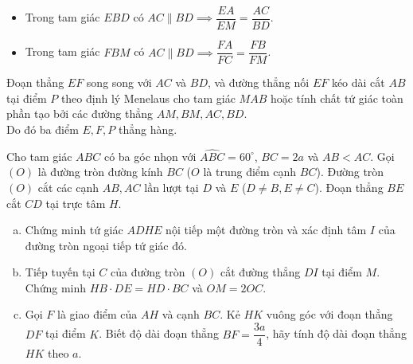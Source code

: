 \begin{bt}
{\begin{enumerate}[a)]
	\begin{itemize}
		\item Trong tam giác $EBD$ có $AC \parallel BD \implies \dfrac{EA}{EM} = \dfrac{AC}{BD}$.
		\item Trong tam giác $FBM$ có $AC \parallel BD \implies \dfrac{FA}{FC} = \dfrac{FB}{FM}$.
	\end{itemize}
	Đoạn thẳng $EF$ song song với $AC$ và $BD$, và đường thẳng nối $EF$ kéo dài cắt $AB$ tại điểm $P$ theo định lý Menelaus cho tam giác $MAB$ hoặc tính chất tứ giác toàn phần tạo bởi các đường thẳng $AM, BM, AC, BD$.\\
	Do đó ba điểm $E, F, P$ thẳng hàng.
\end{enumerate}
}
\end{bt}

\begin{bt}%
Cho tam giác $ABC$ có ba góc nhọn với $\widehat{ABC} = 60^\circ$, $BC = 2a$ và $AB < AC$. Gọi $(O)$ là đường tròn đường kính $BC$ ($O$ là trung điểm cạnh $BC$). Đường tròn $(O)$ cắt các cạnh $AB, AC$ lần lượt tại $D$ và $E$ ($D \ne B, E \ne C$). Đoạn thẳng $BE$ cắt $CD$ tại trực tâm $H$.
\begin{enumerate}[a)]
	\item Chứng minh tứ giác $ADHE$ nội tiếp một đường tròn và xác định tâm $I$ của đường tròn ngoại tiếp tứ giác đó.
	\item Tiếp tuyến tại $C$ của đường tròn $(O)$ cắt đường thẳng $DI$ tại điểm $M$. Chứng minh $HB \cdot DE = HD \cdot BC$ và $OM = 2OC$.
	\item Gọi $F$ là giao điểm của $AH$ và cạnh $BC$. Kẻ $HK$ vuông góc với đoạn thẳng $DF$ tại điểm $K$. Biết độ dài đoạn thẳng $BF = \dfrac{3a}{4}$, hãy tính độ dài đoạn thẳng $HK$ theo $a$.
\end{enumerate}
\end{bt}
